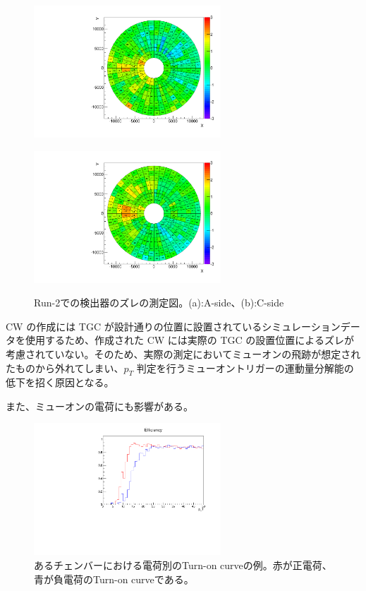 \begin{figure}
    \begin{minipage}[tb]{0.4\linewidth}
        \centering
        \includegraphics[clip, width=7cm]{fig/3/TGCAlign_CW.muon.bias.20160606.v1.A-side.pdf}
        \vspace{10pt}
        \subcaption{}
        \label{}
    \end{minipage}
    \hfill
    \begin{minipage}[tb]{0.4\linewidth}
        \centering
        \includegraphics[clip, width=7cm]{fig/3/TGCAlign_CW.muon.bias.20160606.v1.C-side.pdf}
        \vspace{10pt}
        \subcaption{}
        \label{}
    \end{minipage}
    \caption{Run-2での検出器のズレの測定図。(a):A-side、(b):C-side}
    \label{fig:ズレ}
\end{figure}

CW の作成には TGC が設計通りの位置に設置されているシミュレーションデータを使用するため、作成された CW には実際の TGC の設置位置によるズレが考慮されていない。そのため、実際の測定においてミューオンの飛跡が想定されたものから外れてしまい、$p_T$ 判定を行うミューオントリガーの運動量分解能の低下を招く原因となる。

また、ミューオンの電荷にも影響がある。
\begin{figure}[tb]
  \centering
  \includegraphics[clip, width=7cm]{fig/3/charge_14gev_phi2_eta11.pdf}
  \caption{あるチェンバーにおける電荷別のTurn-on curveの例。赤が正電荷、青が負電荷のTurn-on curveである。}
  \label{fig:fit_def}
\end{figure}

